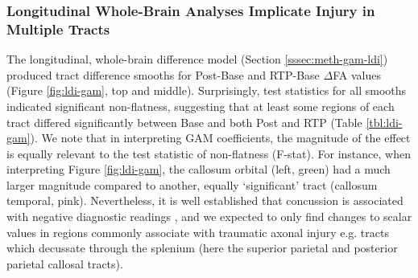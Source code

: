 \documentclass[12pt]{article}
\begin{document}
\subsubsection{Longitudinal Whole-Brain Analyses Implicate Injury in Multiple Tracts}
\label{sssec:res-dwi-tract-wba}
The longitudinal, whole-brain difference model (Section \ref{sssec:meth-gam-ldi}) produced tract difference smooths for Post-Base and RTP-Base $\Delta$FA values (Figure \ref{fig:ldi-gam}, top and middle). Surprisingly, test statistics for all smooths indicated significant non-flatness, suggesting that at least some regions of each tract differed significantly between Base and both Post and RTP (Table \ref{tbl:ldi-gam}). We note that in interpreting GAM coefficients, the magnitude of the effect is equally relevant to the test statistic of non-flatness (F-stat). For instance, when interpreting Figure \ref{fig:ldi-gam}, the callosum orbital (left, green) had a much larger magnitude compared to another, equally `significant' tract (callosum temporal, pink). Nevertheless, it is well established that concussion is associated with negative diagnostic readings \parencite[e.g.][]{klein2019PrevalencePotentiallyClinically}, and we expected to only find changes to scalar values in regions commonly associate with traumatic axonal injury e.g. tracts which decussate through the splenium (here the superior parietal and posterior parietal callosal tracts).
\end{document}

